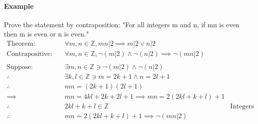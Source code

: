\paragraph*{Example}
Prove the statement by contraposition: "For all integers m and n, if mn is even then m is even or n is even."
\begin{align*}
    \text{Theorem:} \quad & \forall m, n \in \mathbb{Z}, mn | 2 \implies m|2 \lor n|2\\
    \text{Contrapositive:} \quad & \forall m, n \in \mathbb{Z}, \neg (m|2) \land \neg(n|2) \implies \neg (mn|2)\\
    \\
    \text{Suppose:} \quad & \exists m, n \in \mathbb{Z} \ni \neg (m|2) \land \neg(n|2)\\
    \therefore \quad & \exists k, l \in \mathbb{Z} \ni m = 2k + 1 \land n = 2l + 1\\
    \therefore \quad & mn = (2k + 1)(2l + 1)\\
    \implies \quad & mn = 4kl + 2k + 2l + 1 \implies mn = 2(2kl + k + l) + 1\\
    \therefore \quad & 2kl + k + l \in \mathbb{Z} & \text{Integers are closed under addition}\\
    \therefore \quad & mn = 2(2kl + k + l) + 1 \implies \neg(mn|2)\\
\end{align*}